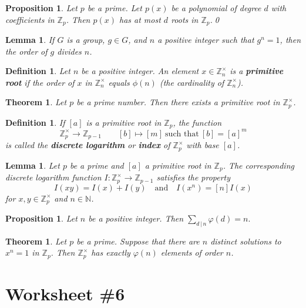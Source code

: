 \documentclass[12pt]{amsart}
\newcommand{\N}{\mathbb{N}}
\newcommand{\Z}{\mathbb{Z}}
\numberwithin{equation}{section}
\theoremstyle{plain} %
\newtheorem{thm}	[section]	{Theorem}
\newtheorem{lem}	[section]	{Lemma}
\newtheorem{prop}	[section]	{Proposition}
\newtheorem{defn}	[section]	{Definition}
\begin{document}
\begin{prop} Let $p$ be a prime. Let $p(x)$ be a polynomial of degree $d$ with coefficients in $\Z_p$. Then $p(x)$ has at most $d$ roots in $\Z_p$.\qed
\end{prop}

\begin{lem} If $G$ is a group, $g\in G$, and $n$ a positive integer such that $g^n=1$, then the order of $g$ divides $n$.
\end{lem}


\begin{defn} Let $n$ be a positive integer. An element $x \in \Z_n^\times$ is a \textbf{primitive root} if the order of $x$ in $\Z_n^\times$ equals $\phi(n)$ (the cardinality of $\Z_n^\times$).
\end{defn}

\begin{thm} Let $p$ be a prime number. Then there exists a primitive root in $\Z_p^\times$.
\end{thm}

\begin{defn} If $[a]$ is a primitive root in $\Z_p$, the function
\[ \Z_p^\times \to \Z_{p-1} \qquad [b]\mapsto [m] \ \text{such that} \ [b]=[a]^m\]
is called the \textbf{discrete logarithm} or \textbf{index} of $\Z_p^\times$ with base $[a]$.
\end{defn}

\begin{lem} Let $p$ be a prime and $[a]$ a primitive root in $\Z_p$. The corresponding discrete logarithm function $I: \Z_p^\times \to \Z_{p-1}$ satisfies the property
\[ I( xy) = I(x) + I(y) \quad \text{and} \quad I(x^n) = [n] I(x)\]
for $x,y\in \Z_p^\times$ and $n\in \N$.
\end{lem}


\begin{prop} Let $n$ be a positive integer. Then $\displaystyle \sum_{d \, |\, n} \varphi(d) = n.$
\end{prop}

\begin{thm} Let $p$ be a prime. Suppose that there are $n$ distinct solutions to $x^n=1$ in $\Z_p$. Then $\Z_p^\times$ has exactly $\varphi(n)$ elements of order $n$.
\end{thm}






\section*{Worksheet \#6}
\end{document}
